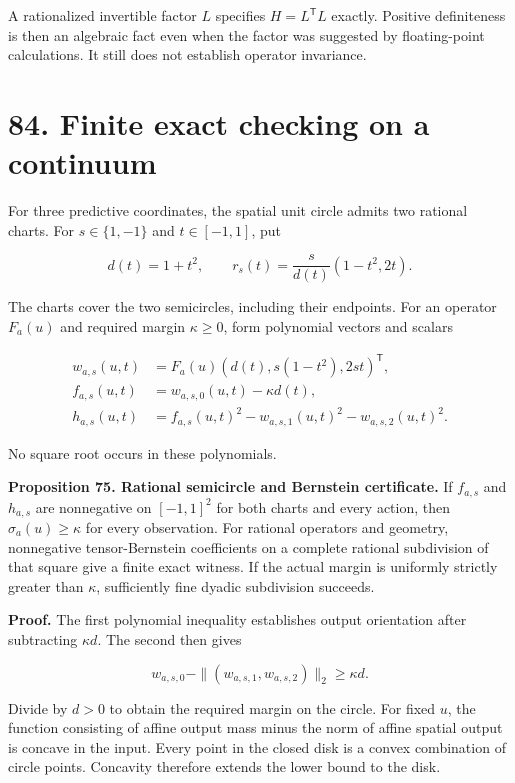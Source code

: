 \documentclass[11pt,letterpaper]{article}
\begin{document}
A rationalized invertible factor \(L\) specifies \(H=L^{\mathsf T}L\)
exactly. Positive definiteness is then an algebraic fact even when the
factor was suggested by floating-point calculations. It still does not
establish operator invariance.

\section{84. Finite exact checking on a
continuum}\label{finite-exact-checking-on-a-continuum}

For three predictive coordinates, the spatial unit circle admits two
rational charts. For \(s\in\{1,-1\}\) and \(t\in[-1,1]\), put

\[
d(t)=1+t^2,\qquad
r_s(t)=\frac{s}{d(t)}(1-t^2,2t).
\]

The charts cover the two semicircles, including their endpoints. For an
operator \(F_a(u)\) and required margin \(\kappa\geq0\), form polynomial
vectors and scalars

\[
\begin{aligned}
w_{a,s}(u,t)&=F_a(u)(d(t),s(1-t^2),2st)^{\mathsf T},\\
f_{a,s}(u,t)&=w_{a,s,0}(u,t)-\kappa d(t),\\
h_{a,s}(u,t)&=f_{a,s}(u,t)^2-w_{a,s,1}(u,t)^2-w_{a,s,2}(u,t)^2.
\end{aligned}
\]

No square root occurs in these polynomials.

\textbf{Proposition 75. Rational semicircle and Bernstein certificate.}
If \(f_{a,s}\) and \(h_{a,s}\) are nonnegative on \([-1,1]^2\) for both
charts and every action, then \(\sigma_a(u)\geq\kappa\) for every
observation. For rational operators and geometry, nonnegative
tensor-Bernstein coefficients on a complete rational subdivision of that
square give a finite exact witness. If the actual margin is uniformly
strictly greater than \(\kappa\), sufficiently fine dyadic subdivision
succeeds.

\textbf{Proof.} The first polynomial inequality establishes output
orientation after subtracting \(\kappa d\). The second then gives

\[
w_{a,s,0}-\|(w_{a,s,1},w_{a,s,2})\|_2\geq\kappa d.
\]

Divide by \(d>0\) to obtain the required margin on the circle. For fixed
\(u\), the function consisting of affine output mass minus the norm of
affine spatial output is concave in the input. Every point in the closed
disk is a convex combination of circle points. Concavity therefore
extends the lower bound to the disk.
\end{document}
